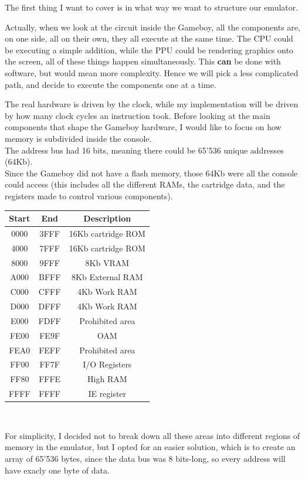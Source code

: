\documentclass{article}
\begin{document}
The first thing I want to cover is in what way we want to structure our emulator.

Actually, when we look at the circuit inside the Gameboy, all the components are, on one side, all on their own, they all execute at the same time. The CPU could be executing a simple addition, while the PPU could be rendering graphics onto the screen, all of these things happen simultaneously. This \textbf{can} be done with software, but would mean more complexity. Hence we will pick a less complicated path, and decide to execute the components one at a time.

The real hardware is driven by the clock, while my implementation will be driven by how many clock cycles an instruction took.
\newpage
Before looking at the main components that shape the Gameboy hardware, I would like to focus on how memory is subdivided inside the console.\\
The address bus had 16 bits, meaning there could be 65'536 unique addresses (64Kb). \\
Since the Gameboy did not have a flash memory, those 64Kb were all the console could access (this includes all the different RAMs, the cartridge data, and the registers made to control various components).
\begin{center}
\begin{tabular}{ ||c|c|c|| } \hline Start & End & Description \\ \hline 0000 & 3FFF & 16Kb cartridge ROM \\ 4000 & 7FFF & 16Kb cartridge ROM \\ 8000 & 9FFF & 8Kb VRAM \\ A000 & BFFF & 8Kb External RAM \\ C000 & CFFF & 4Kb Work RAM \\ D000 & DFFF & 4Kb Work RAM \\ E000 & FDFF & Prohibited area \\ FE00 & FE9F & OAM \\ FEA0 & FEFF & Prohibited area \\ FF00 & FF7F & I/O Registers \\ FF80 & FFFE & High RAM \\ FFFF & FFFF & IE register \\ \hline \end{tabular}
\

\end{center}
For simplicity, I decided not to break down all these areas into different regions of memory in the emulator, but I opted for an easier solution, which is to create an array of 65'536 bytes, since the data bus was 8 bits-long, so every address will have exacly one byte of data.
\end{document}
